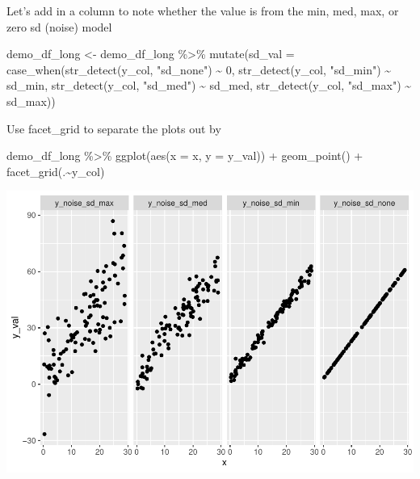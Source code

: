 \documentclass[
]{book}
\newenvironment{Shaded}{\begin{snugshade}}{\end{snugshade}}
\newcommand{\AttributeTok}[1]{\textcolor[rgb]{0.77,0.63,0.00}{#1}}
\newcommand{\DecValTok}[1]{\textcolor[rgb]{0.00,0.00,0.81}{#1}}
\newcommand{\FunctionTok}[1]{\textcolor[rgb]{0.00,0.00,0.00}{#1}}
\newcommand{\NormalTok}[1]{#1}
\newcommand{\OtherTok}[1]{\textcolor[rgb]{0.56,0.35,0.01}{#1}}
\newcommand{\SpecialCharTok}[1]{\textcolor[rgb]{0.00,0.00,0.00}{#1}}
\newcommand{\StringTok}[1]{\textcolor[rgb]{0.31,0.60,0.02}{#1}}
\begin{document}
Let's add in a column to note whether the value is from the min, med, max, or zero sd (noise) model

\begin{Shaded}
\begin{Highlighting}[]
\NormalTok{demo\_df\_long }\OtherTok{\textless{}{-}}\NormalTok{ demo\_df\_long }\SpecialCharTok{\%\textgreater{}\%} 
  \FunctionTok{mutate}\NormalTok{(}\AttributeTok{sd\_val =} \FunctionTok{case\_when}\NormalTok{(}\FunctionTok{str\_detect}\NormalTok{(y\_col, }\StringTok{"sd\_none"}\NormalTok{) }\SpecialCharTok{\textasciitilde{}} \DecValTok{0}\NormalTok{,}
                            \FunctionTok{str\_detect}\NormalTok{(y\_col, }\StringTok{"sd\_min"}\NormalTok{) }\SpecialCharTok{\textasciitilde{}}\NormalTok{ sd\_min,}
                            \FunctionTok{str\_detect}\NormalTok{(y\_col, }\StringTok{"sd\_med"}\NormalTok{) }\SpecialCharTok{\textasciitilde{}}\NormalTok{ sd\_med,}
                            \FunctionTok{str\_detect}\NormalTok{(y\_col, }\StringTok{"sd\_max"}\NormalTok{) }\SpecialCharTok{\textasciitilde{}}\NormalTok{ sd\_max))}
\end{Highlighting}
\end{Shaded}

Use facet\_grid to separate the plots out by

\begin{Shaded}
\begin{Highlighting}[]
\NormalTok{demo\_df\_long }\SpecialCharTok{\%\textgreater{}\%} 
  \FunctionTok{ggplot}\NormalTok{(}\FunctionTok{aes}\NormalTok{(}\AttributeTok{x =}\NormalTok{ x, }\AttributeTok{y =}\NormalTok{ y\_val)) }\SpecialCharTok{+}
  \FunctionTok{geom\_point}\NormalTok{() }\SpecialCharTok{+}
  \FunctionTok{facet\_grid}\NormalTok{(.}\SpecialCharTok{\textasciitilde{}}\NormalTok{y\_col)}
\end{Highlighting}
\end{Shaded}

\includegraphics{test_course_notes_files/figure-latex/remedy014-1.pdf}
\end{document}
